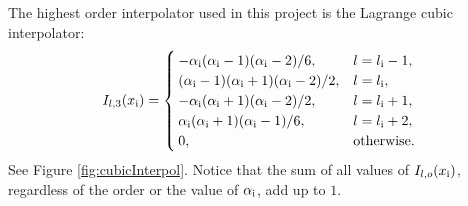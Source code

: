 The highest order interpolator used in this project is the Lagrange cubic interpolator: 
\begin{equation}\label{eq:cubicI}
    I_{l,3}(x_{\text{i}}) = \begin{cases}
        -\alpha_{\text{i}} (\alpha_{\text{i}}-1)(\alpha_{\text{i}}-2)/6, & l = l_{\text{i}}-1,\\
        (\alpha_{\text{i}}-1)(\alpha_{\text{i}}+1)(\alpha_{\text{i}}-2)/2,  & l = l_{\text{i}},\\
        -\alpha_{\text{i}} (\alpha_{\text{i}}+1)(\alpha_{\text{i}}-2)/2, & l = l_{\text{i}} + 1,\\
        \alpha_{\text{i}} (\alpha_{\text{i}}+1)(\alpha_{\text{i}}-1)/6, & l = l_{\text{i}} + 2,\\
        0, & \text{otherwise.}
    \end{cases}
\end{equation}
See Figure \ref{fig:cubicInterpol}. 
Notice that the sum of all values of $I_{l, o}(x_{\text{i}})$, regardless of the order or the value of $\alpha_{\text{i}}$, add up to $1$.


